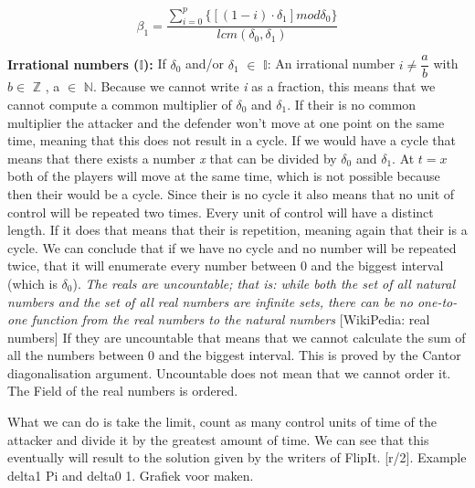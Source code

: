 \begin{equation}\label{first}
\beta_{1} = \dfrac{\sum_{i=0}^{p} \lbrace [( 1 - i ) \cdot \delta_{1}] mod \delta_{0} \rbrace }{lcm(\delta_{0},\delta_{1})} 
\end{equation}

%


\textbf{Irrational numbers (\(\mathbb{I}\)):} If $\delta_{0}$ and/or $\delta_{1}$ $\in$ \(\mathbb{I}\):
An irrational number $ i \neq \dfrac{a}{b}$ with $b \in$ \(\mathbb{Z}\) , a $\in$ \(\mathbb{N}\).
Because we cannot write \textit{i} as a fraction, this means that we cannot compute a common multiplier of $\delta_{0}$ and $\delta_{1}$. If their is no common multiplier the attacker and the defender won't move at one point on the same time, meaning that this does not result in a cycle. If we would have a cycle that means that there exists a number \textit{x} that can be divided by $\delta_{0}$ and $\delta_{1}$. At $t=x$ both of the players will move at the same time, which is not possible because then their would be a cycle. Since their is no cycle it also means that no unit of control will be repeated two times. Every unit of control will have a distinct length. If it does that means that their is repetition, meaning again that their is a cycle.  We can conclude that if we have no cycle and no number will be repeated twice, that it will enumerate every number between 0 and the biggest interval (which is $\delta_{0}$). 
\textit{The reals are uncountable; that is: while both the set of all natural numbers and the set of all real numbers are infinite sets, there can be no one-to-one function from the real numbers to the natural numbers} [WikiPedia: real numbers] If they are uncountable that means that we cannot calculate the sum of all the numbers between 0 and the biggest interval. This is proved by the Cantor diagonalisation argument. Uncountable does not mean that we cannot order it. The Field of the real numbers is ordered. 

What we can do is take the limit, count as many control units of time of the attacker and divide it by the greatest amount of time. We can see that this eventually will result to the solution given by the writers of FlipIt. [r/2]. Example delta1 Pi and delta0 1. Grafiek voor maken.


